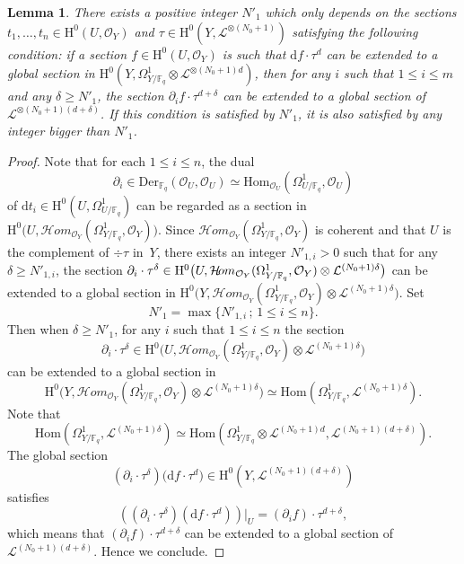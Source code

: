 \documentclass[JEP,XML,SOM,Unicode,published]{cedram}
\newcommand{\sep}{\,;\,}
\newcommand{\cHom}{\mathcal{H}\!om}
\theoremstyle{plain}
\newtheorem{lem}[thm]{Lemma}
\theoremstyle{definition}
\newcommand{\ho}{\mathrm{H}}
\newcommand{\Hom}{\mathrm{Hom}}
\newcommand{\li}{\mathcal{L}}
\newcommand{\F}{\mathbb{F}}
\begin{document}
\begin{lem}\label{beforeextend}
There exists a positive integer $N'_1$ which only depends on the sections $t_1,\dots, t_n\in \ho^0(U, \mathcal{O}_Y)$ and $\tau\in \ho^0(Y, \li^{\otimes (N_0+1)})$ satisfying the following condition: if a section $f \in \ho^0(U, \mathcal{O}_Y)$ is such that $\mathrm{d}f\cdot \tau^{d}$ can be extended to a global section in $\ho^0(Y, \Omega_{Y/\F_q}^1\otimes \li^{\otimes(N_0+1)d})$, then for any $i$ such that $1\leq i\leq m$ and any $\delta \geq N'_1$, the section $\partial_i f \cdot \tau^{d+\delta}$ can be extended to a global section of $\li^{\otimes (N_0+1)(d+\delta)}$. If this condition is satisfied by $N'_1$, it is also satisfied by any integer bigger than $N'_1$.
\end{lem}
\begin{proof}[Proof]
Note that for each $1\leq i\leq n$, the dual
\[
\partial_i\in \mathrm{Der}_{\F_q}(\mathcal{O}_U, \mathcal{O}_U)\simeq \Hom_{\mathcal{O}_U}(\Omega^1_{U/\F_q}, \mathcal{O}_U)
\]
of $\mathrm{d}t_i\in \ho^0(U, \Omega^1_{U/\F_q})$ can be regarded as a section in $\ho^0\bigl(U, \cHom_{\mathcal{O}_Y}(\Omega^1_{Y/\F_q}, \mathcal{O}_Y) \bigr)$. Since $\cHom_{\mathcal{O}_Y}(\Omega^1_{Y/\F_q}, \mathcal{O}_Y)$ is coherent and that $U$ is the complement of $\div \tau$ in~$Y$, there exists an integer $N'_{1,i}>0$ such that for any $\delta\geq N'_{1,i}$, the section $\partial_i\cdot\nobreak \tau^{\delta}\in \ho^0\bigl(U, \cHom_{\mathcal{O}_Y}(\Omega^1_{Y/\F_q}, \mathcal{O}_Y)\otimes \li^{(N_0+1)\delta} \bigr)$ can be extended to a global section in $\ho^0\bigl(Y, \cHom_{\mathcal{O}_Y}(\Omega^1_{Y/\F_q}, \mathcal{O}_Y)\otimes \li^{(N_0+1)\delta} \bigr)$. Set\vspace*{-3pt}
\[
N'_1=\max \{ N'_{1,i}\sep 1\leq i\leq n\}.
\]
Then when $\delta\geq N'_1$, for any $i$ such that $1\leq i\leq n$ the section\vspace*{-3pt}
\[
\partial_i\cdot \tau^{\delta}\in \ho^0\bigl(U, \cHom_{\mathcal{O}_Y}(\Omega^1_{Y/\F_q}, \mathcal{O}_Y)\otimes \li^{(N_0+1)\delta} \bigr)
\]
can be extended to a global section in\vspace*{-3pt}
\[
\ho^0\bigl(Y, \cHom_{\mathcal{O}_Y}(\Omega^1_{Y/\F_q}, \mathcal{O}_Y)\otimes \li^{(N_0+1)\delta} \bigr)\simeq \Hom(\Omega^1_{Y/\F_q}, \li^{(N_0+1)\delta}).
\]
Note that\vspace*{-3pt}
\[
\Hom(\Omega^1_{Y/\F_q}, \li^{(N_0+1)\delta}) \simeq \Hom(\Omega^1_{Y/\F_q}\otimes \li^{(N_0+1)d}, \li^{(N_0+1)(d+\delta)}).
\]
The global section\vspace*{-3pt}
\[
(\partial_i\cdot \tau^{\delta})\big(\mathrm{d}f\cdot \tau^{d} \big)\in \ho^0(Y, \li^{(N_0+1)(d+\delta)})
\]
satisfies\vspace*{-3pt}
\[
\left((\partial_i\cdot \tau^{\delta})(\mathrm{d}f\cdot \tau^{d})\right)\big|_U= \left(\partial_i f \right)\cdot \tau^{d+\delta},
\]
which means that $\left(\partial_i f \right)\cdot \tau^{d+\delta}$ can be extended to a global section of $\li^{(N_0+1)(d+\delta)}$. Hence we conclude.
\end{proof}
\end{document}
